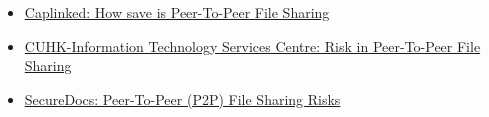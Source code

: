 \documentclass[a4paper,12pt]{article}
\begin{document}
\begin{itemize}
    \item \href{https://www.caplinked.com/blog/is-peer-to-peer-file-sharing-safe/}{Caplinked: How save is Peer-To-Peer File Sharing}
    \item \href{https://www.itsc.cuhk.edu.hk/it-policies/risks-in-peer-to-peer-file-sharing/}{CUHK-Information Technology Services Centre: Risk in Peer-To-Peer File Sharing}
    \item \href{https://www.securedocs.com/blog/2013/02/peer-to-peer-p2p-file-sharing-risks}{SecureDocs: Peer-To-Peer (P2P) File Sharing Risks}

    
\end{itemize}
\end{document}
